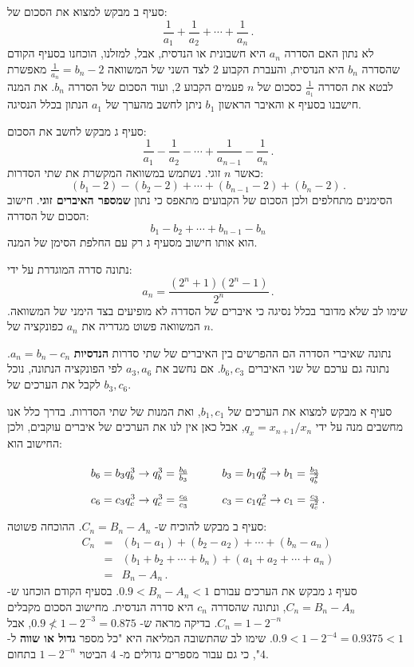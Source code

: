 \documentclass[12pt,a4paper]{article}
\begin{document}
סעיף ב מבקש למצוא את הסכום של:
\[
\frac{1}{a_1} + \frac{1}{a_2} + \cdots + \frac{1}{a_n}\,.
\]
לא נתון האם הסדרה $a_n$ היא חשבונית או הנדסית, אבל, למזלנו, הוכחנו בסעיף הקודם שהסדרה 
$b_n$
היא הנדסית, והעברת הקבוע
$2$
לצד השני של המשוואה 
$\frac{1}{a_n} = b_n - 2$
מאפשרת לבטא את הסדרה
$\frac{1}{a_1}$
כסכום של 
$n$
פעמים הקבוע
$2$,
ועוד הסכום של הסדרה
$b_n$.
את המנה חישבנו בסעיף א והאיבר הראשון
$b_1$
ניתן לחשב מהערך של
$a_1$
הנתון בכלל הנסיגה.

סעיף ג מבקש לחשב את הסכום:
\[
\frac{1}{a_1} - \frac{1}{a_2} - \cdots + \frac{1}{a_{n-1}} - \frac{1}{a_n}\,.
\]
כאשר
$n$
זוגי. נשתמש במשוואה המקשרת את שתי הסדרות:
\[
(b_1 - 2) - (b_2 - 2) + \cdots + (b_{n-1} - 2) + (b_n - 2)\,.
\]
הסימנים מתחלפים ולכן הסכום של הקבועים מתאפס כי נתון
\textbf{שמספר האיברים זוגי}.
חישוב הסכום של הסדרה:
\[
b_1 - b_2 + \cdots + b_{n-1} - b_n
\]
הוא אותו חישוב מסעיף ג רק עם החלפת הסימן של המנה.

\bigskip

\textbf{}
נתונה סדרה המוגדרת על ידי:
\[
a_n = \frac{(2^{n}+1)(2^{n}-1)}{2^{n}}\,.
\]
שימו לב שלא מדובר בכלל נסיגה כי איברים של הסדרה לא מופיעים בצד הימני של המשוואה. המשוואה פשוט מגדריה את
$a_n$
כפונקציה של
$n$.

נתונה שאיברי הסדרה הם ההפרשים בין האיברים של שתי סדרות
\textbf{הנדסיות}
$a_n = b_n - c_n$.
נתונה גם ערכם של שני האיברים
$b_6, c_3$.
אם נחשב את
$a_3, a_6$
לפי הפונקציה הנתונה, נוכל לקבל את הערכים של
$b_3, c_6$.

סעיף א מבקש למצוא את הערכים של
$b_1, c_1$,
ואת המנות של שתי הסדרות. בדרך כלל אנו מחשבים מנה על ידי
$q_x=x_{n+1}/x_n$,
אבל כאן אין לנו את הערכים של איברים עוקבים, ולכן החישוב הוא:
\[
\renewcommand{\arraystretch}{2}
\begin{array}{l@{\quad\quad\quad}l}
b_6 = b_3q_b^3 \rightarrow q_b^3 = \frac{b_6}{b_3}&
b_3 = b_1 q_b^2 \rightarrow b_1 = \frac{b_3}{q_b^2}\\
c_6 = c_3q_c^3 \rightarrow q_c^3 = \frac{c_6}{c_3} &
c_3 = c_1 q_c^2 \rightarrow c_1 =\frac{c_3}{q_c^2}\,.
\end{array}
\]
סעיף ב מבקש להוכיח ש-%
$C_n=B_n-A_n$.
ההוכחה פשוטה:
\begin{eqnarray*}
C_n &=& (b_1-a_1) + (b_2 - a_2) + \cdots + (b_n-a_n)\\
&=&(b_1 + b_2 + \cdots + b_n) + (a_1 + a_2 + \cdots + a_n)\\
&=& B_n - A_n\,.
\end{eqnarray*}
סעיף ג מבקש את הערכים עבורם
$0.9 < B_n-A_n < 1$.
בסעיף הקודם הוכחנו ש-%
$C_n=B_n-A_n$,
ונתונה שהסדרה 
$c_n$
היא סדרה הנדסית. מחישוב הסכום מקבלים
$C_n = 1-2^{-n}$.
בדיקה מראה ש-%
$0.9 \not< 1-2^{-3}=0.875$,
אבל
$0.9 < 1-2^{-4}=0.9375 < 1$.
שימו לב שהתשובה המליאה היא "כל מספר
\textbf{גדול או שווה}
ל-%
$4$",
כי גם עבור מספרים גדולים מ-%
$4$
הביטוי
$1-2^{-n}$
בתחום.
\end{document}
